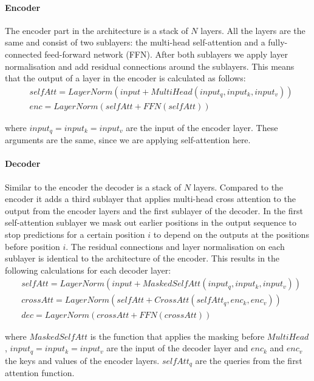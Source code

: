 \paragraph{Encoder}
The encoder part in the architecture is a stack of $N$ layers. All the layers are the same and consist of two sublayers: the multi-head self-attention and a fully-connected feed-forward network (FFN). After both sublayers we apply layer normalisation\cite{ba_layer_2016} and add residual connections\cite{he_deep_2015} around the sublayers. This means that the output of a layer in the encoder is calculated as follows: 
\begin{align}
\label{par:prelim:transformer-encoder}
&selfAtt = LayerNorm(input + MultiHead(input_q, input_k, input_v))\\
&enc = LayerNorm(selfAtt + FFN(selfAtt))
\end{align}

where $input_q = input_k = input_v$ are the input of the encoder layer. These arguments are the same, since we are applying self-attention here.


\paragraph{Decoder}
Similar to the encoder the decoder is a stack of $N$ layers. Compared to the encoder it adds a third sublayer that applies multi-head cross attention to the output from the encoder layers and the first sublayer of the decoder. In the first self-attention sublayer we mask out earlier positions in the output sequence to stop predictions for a certain position $i$ to depend on the outputs at the positions before position $i$. The residual connections and layer normalisation on each sublayer is identical to the architecture of the encoder. This results in the following calculations for each decoder layer: 
\begin{align}
&selfAtt = LayerNorm(input + MaskedSelfAtt(input_q, input_k, input_v))\\
&crossAtt = LayerNorm(selfAtt + CrossAtt(selfAtt_q, enc_k, enc_v))\\
&dec = LayerNorm(crossAtt + FFN(crossAtt))
\end{align}

where $MaskedSelfAtt$ is the function that applies the masking before $MultiHead$, $input_q = input_k = input_v$ are the input of the decoder layer and $enc_k$ and $enc_v$ the keys and values of the encoder layers. $selfAtt_q$ are the queries from the first attention function.

